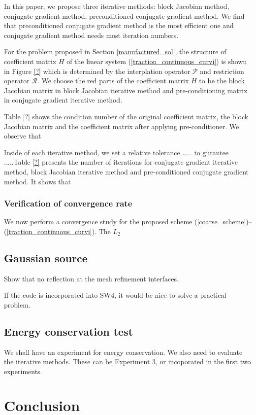 \documentclass[a4paper]{article}
\begin{document}
In this paper, we propose three iterative methods: block Jacobian method, conjugate gradient method, preconditioned conjugate gradient method. We find that preconditioned conjugate gradient method is the most efficient one and conjugate gradient method needs most iteration numbers.

For the problem proposed in Section \ref{manufactured_sol}, the structure of coefficient matrix $H$ of the linear system (\ref{traction_continuous_curvi}) is shown in Figure \ref{?} which is determined by the interplation operator $\mathcal{P}$ and restriction operator $\mathcal{R}$. We choose the red parts of the coefficient matrix $H$ to be the block Jacobian matrix in block Jacobian iterative method and pre-conditioning matrix in conjugate gradient iterative method. 

Table \ref{?} shows the condition number of the original coefficient matrix, the block Jacobian matrix and the coefficient matrix after applying pre-conditioner. We observe that

Inside of each iterative method, we set a relative tolerance ..... to gurantee .....Table \ref{?} presents the number of iterations for conjugate gradient iterative method, block Jacobian iterative method and pre-conditioned conjugate gradient method. It shows that

\subsubsection{Verification of convergence rate}\label{convergence_study}
We now perform a convergence study for the proposed scheme (\ref{coarse_scheme})--(\ref{traction_continuous_curvi}). The $L_2$

\subsection{Gaussian source}\label{gaussian_source}
Show that no reflection at the mesh refinement interfaces. 

If the code is incorporated into SW4, it would be nice to solve a practical problem. 

\subsection{Energy conservation test}\label{conserved_energy}
We shall have an experiment for energy conservation. We also need to evaluate the iterative methods. These can be Experiment 3, or incoporated in the first two experiments.

\section{Conclusion}
\end{document}
